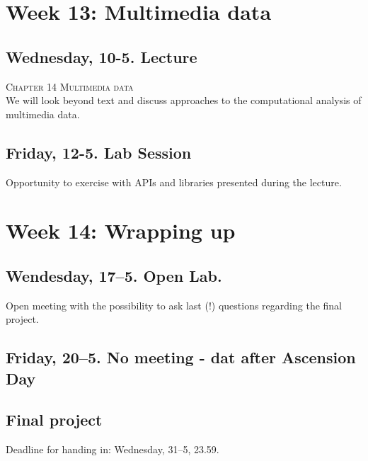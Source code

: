 





\section*{Week 13: Multimedia data}

\subsection*{Wednesday, 10-5. Lecture}
\textsc{ Chapter 14 Multimedia data}\\
We will look beyond text and discuss approaches to the computational analysis of multimedia data.


\subsection*{Friday, 12-5. Lab Session}
Opportunity to exercise with APIs and libraries presented during the lecture.




\section*{Week 14: Wrapping up}

\subsection*{Wendesday, 17--5. Open Lab.}
Open meeting with the possibility to ask last (!) questions regarding the final project.


\subsection*{Friday, 20--5. No meeting - dat after Ascension Day}



\subsection*{Final project}
Deadline for handing in: Wednesday, 31--5, 23.59.
